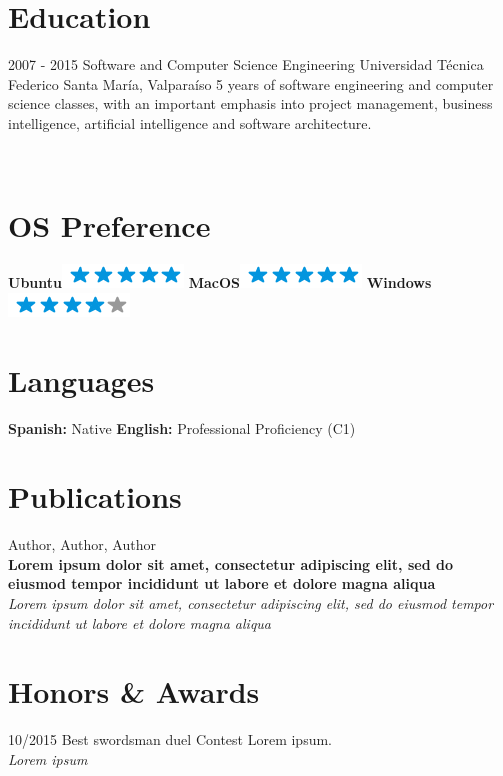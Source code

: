 \documentclass[]{friggeri-cv}
\begin{document}
\section{Education}
\begin{entrylist}
  \entry
    {2007 - 2015}
    {Software and Computer Science Engineering}
    {Universidad Técnica Federico Santa María, Valparaíso}
    {5\+ years of software engineering and computer science classes, with an important emphasis into project management, business intelligence, artificial intelligence and software architecture.\\}
\end{entrylist}

\newpage

\begin{aside}
~
~
~
  \section{OS Preference}
    \textbf{Ubuntu}\includegraphics[scale=0.40]{img/5stars.png}
    \textbf{MacOS}\includegraphics[scale=0.40]{img/5stars.png}
    \textbf{Windows}\includegraphics[scale=0.40]{img/4stars.png}
    ~
  \section{Languages}
    \textbf{Spanish:} Native
    \textbf{English:} Professional Proficiency (C1)
    ~
\end{aside}

\section{Publications}
Author, Author, Author\\
\textbf{Lorem ipsum dolor sit amet, consectetur adipiscing elit, sed do eiusmod tempor incididunt ut labore et dolore magna aliqua}\\
\emph{Lorem ipsum dolor sit amet, consectetur adipiscing elit, sed do eiusmod tempor incididunt ut labore et dolore magna aliqua}
\\
\section{Honors \& Awards}
\begin{entrylist}
  \entry
    {10/2015}
    {Best swordsman duel}
    {Contest}
    {Lorem ipsum.\\
    \emph{Lorem ipsum}}
\end{entrylist}
\end{document}
